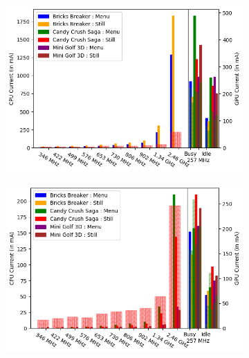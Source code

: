 \fi

\begin{figure}[tp]
    \centering
     \begin{subfigure}[b]{0.32\textwidth}
         \centering
         \includegraphics[width=\textwidth]{figures/002_Pixel2_1_nano_equations.png}
         \label{fig:number_parameters_vs_duration_100s_0}
     \end{subfigure}
    \begin{subfigure}[b]{0.32\textwidth}
         \centering
         \includegraphics[width=\textwidth]{figures/003_MotoZ3_1_nano_equations.png}
         \label{fig:number_parameters_vs_duration_100s_100}
     \end{subfigure}
    \begin{subfigure}[b]{0.32\textwidth}

\end{subfigure}
\end{figure}
